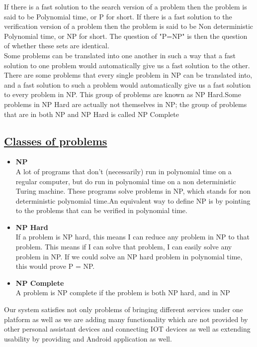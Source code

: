 \hspace{1em}If there is a fast solution to the search version of a problem then the problem is
said to be Polynomial time, or P for short. If there is a fast solution to the verification version of a problem then the problem is said to be Non deterministic Polynomial time,
or NP for short. The question of "P=NP" is then the question of whether these sets are identical.\\

\hspace{1em}Some problems can be translated into one another in such a way that a fast
solution to one problem would automatically give us a fast solution to the
other. There are some problems that every single problem in NP can be
translated into, and a fast solution to such a problem would automatically give
us a fast solution to every problem in NP. This group of problems are known as
NP Hard.Some problems in NP Hard
are actually not themselves in NP; the
group of problems that are in both NP and NP Hard
is called NP Complete

\subsection*{\underline{Classes of problems}}
\begin{itemize}
\item \textbf{NP}\\
A lot of programs that don't (necessarily) run in polynomial time
on a regular computer, but do run in polynomial time on a non deterministic
Turing machine. These programs solve problems in NP, which stands for
non deterministic polynomial time.An equivalent way to define NP is by pointing to the problems that can be
verified in polynomial time.

\item \textbf{NP Hard}\\
If a problem is NP hard,
this means I can reduce any problem in NP to that problem. This means if I can solve that problem, I can easily solve any problem in NP. If we could solve an NP hard
problem in polynomial time, this would
prove P = NP.

\item \textbf{NP Complete}\\
A problem is NP complete
if the problem is both
NP hard, and in NP
\end{itemize}

\noindent
\hspace{5em}Our system satisfies not only problems of bringing different services under one platform as well as we are adding many functionality which are not provided by other personal assistant devices and connecting IOT devices as well as extending usability by providing and Android application as well.\\

